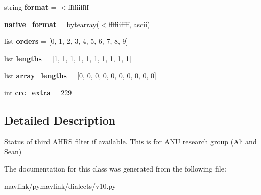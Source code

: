 \begin{DoxyCompactItemize}
string {\bfseries format} = \textquotesingle{}$<$ffffiiffff\textquotesingle{}
\item 
\mbox{\label{classpymavlink_1_1dialects_1_1v10_1_1MAVLink__ahrs3__message_ab363b56439c68215f7075d2989f08fe7}} 
{\bfseries native\+\_\+format} = bytearray(\textquotesingle{}$<$ffffiiffff\textquotesingle{}, \textquotesingle{}ascii\textquotesingle{})
\item 
\mbox{\label{classpymavlink_1_1dialects_1_1v10_1_1MAVLink__ahrs3__message_aec949d315f04b23eedce746746c35e05}} 
list {\bfseries orders} = \mbox{[}0, 1, 2, 3, 4, 5, 6, 7, 8, 9\mbox{]}
\item 
\mbox{\label{classpymavlink_1_1dialects_1_1v10_1_1MAVLink__ahrs3__message_a99d09ec01dee764e3dcd4b9013fc90ca}} 
list {\bfseries lengths} = \mbox{[}1, 1, 1, 1, 1, 1, 1, 1, 1, 1\mbox{]}
\item 
\mbox{\label{classpymavlink_1_1dialects_1_1v10_1_1MAVLink__ahrs3__message_a85c9637a91b5d7b7af4f642fbd4ae13b}} 
list {\bfseries array\+\_\+lengths} = \mbox{[}0, 0, 0, 0, 0, 0, 0, 0, 0, 0\mbox{]}
\item 
\mbox{\label{classpymavlink_1_1dialects_1_1v10_1_1MAVLink__ahrs3__message_a01ae852e6401b86f402944610a1fbd56}} 
int {\bfseries crc\+\_\+extra} = 229
\end{DoxyCompactItemize}


\subsection{Detailed Description}
\begin{DoxyVerb}Status of third AHRS filter if available. This is for ANU
research group (Ali and Sean)
\end{DoxyVerb}
 

The documentation for this class was generated from the following file\+:\begin{DoxyCompactItemize}
\item 
mavlink/pymavlink/dialects/v10.\+py\end{DoxyCompactItemize}
